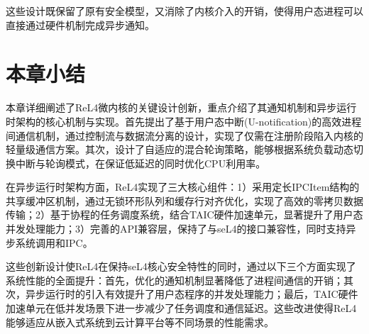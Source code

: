 这些设计既保留了原有安全模型，又消除了内核介入的开销，使得用户态进程可以直接通过硬件机制完成异步通知。

\section{本章小结}
本章详细阐述了ReL4微内核的关键设计创新，重点介绍了其通知机制和异步运行时架构的核心机制与实现。首先提出了基于用户态中断(U-notification)的高效进程间通信机制，通过控制流与数据流分离的设计，实现了仅需在注册阶段陷入内核的轻量级通信方案。其次，设计了自适应的混合轮询策略，能够根据系统负载动态切换中断与轮询模式，在保证低延迟的同时优化CPU利用率。

在异步运行时架构方面，ReL4实现了三大核心组件：1）采用定长IPCItem结构的共享缓冲区机制，通过无锁环形队列和缓存行对齐优化，实现了高效的零拷贝数据传输；2）基于协程的任务调度系统，结合TAIC硬件加速单元，显著提升了用户态并发处理能力；3）完善的API兼容层，保持了与seL4的接口兼容性，同时支持异步系统调用和IPC。

这些创新设计使ReL4在保持seL4核心安全特性的同时，通过以下三个方面实现了系统性能的全面提升：首先，优化的通知机制显著降低了进程间通信的开销；其次，异步运行时的引入有效提升了用户态程序的并发处理能力；最后，TAIC硬件加速单元在低并发场景下进一步减少了任务调度和通信延迟。这些改进使得ReL4能够适应从嵌入式系统到云计算平台等不同场景的性能需求。